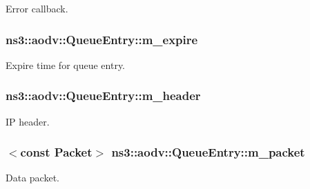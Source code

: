 Error callback. 

\subsubsection[{\texorpdfstring{m\+\_\+expire}{m_expire}}]{ ns3\+::aodv\+::\+Queue\+Entry\+::m\+\_\+expire\hspace{0.3cm}{\ttfamily [private]}}\hypertarget{classns3_1_1aodv_1_1QueueEntry_aeb63cecd46c78f97879214b35decabd3}{}\label{classns3_1_1aodv_1_1QueueEntry_aeb63cecd46c78f97879214b35decabd3}


Expire time for queue entry. 

\subsubsection[{\texorpdfstring{m\+\_\+header}{m_header}}]{ ns3\+::aodv\+::\+Queue\+Entry\+::m\+\_\+header\hspace{0.3cm}{\ttfamily [private]}}\hypertarget{classns3_1_1aodv_1_1QueueEntry_a13154eeec0f1a300a6730875d304733e}{}\label{classns3_1_1aodv_1_1QueueEntry_a13154eeec0f1a300a6730875d304733e}


IP header. 

\subsubsection[{\texorpdfstring{m\+\_\+packet}{m_packet}}]{$<$const {\bf Packet}$>$ ns3\+::aodv\+::\+Queue\+Entry\+::m\+\_\+packet\hspace{0.3cm}{\ttfamily [private]}}\hypertarget{classns3_1_1aodv_1_1QueueEntry_a2d7b3b53e292d6a95a42234b9f0d86c5}{}\label{classns3_1_1aodv_1_1QueueEntry_a2d7b3b53e292d6a95a42234b9f0d86c5}


Data packet. 

